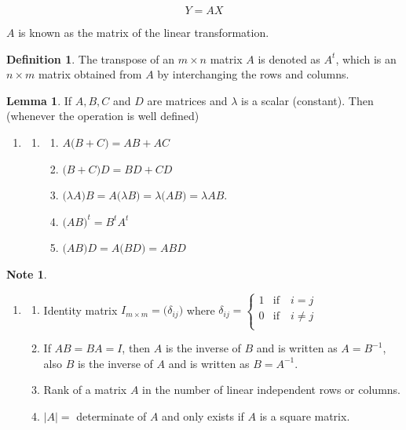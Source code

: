 \documentclass[11pt,a4paper]{article}
\theoremstyle{definition}
\newtheorem{defn}[thm]{Definition}
\newtheorem*{note}{Note}
\newtheorem{lem}[thm]{Lemma}
\begin{document}
$$\boxed{Y=AX}$$

$A$  is known as the matrix of the linear transformation.\\


\begin{defn}\label{res:defn:1.1.1}
The transpose of an $m\times n$ matrix $A$ is denoted as $A^t$, which is an $n\times m$ matrix obtained from $A$ by interchanging the rows and columns.
\end{defn}


\begin{lem}\label{res:lem:1.1.2}
If $A,B, C$ and $D$ are matrices and $\lambda$ is a scalar (constant). Then (whenever the operation is well defined)
\begin{enumerate}
\item[]
\begin{enumerate}
\item[]
\begin{enumerate}
       \item $A\big(B+C\big) = AB+AC$\\
       \item $\big(B+C\big)D = BD + CD$\\
       \item $\big(\lambda A\big)B = A\big(\lambda B\big)=\lambda\big(AB\big)= \lambda AB$.\\
       \item $\big(AB\big)^t=B^tA^t$\\
       \item $\big(AB\big)D=A\big(BD\big) = ABD$\\
\end{enumerate}
\end{enumerate}
\end{enumerate}

\end{lem}


\begin{note}
\begin{enumerate}
\item[]
\begin{enumerate}
    \item[i.] Identity matrix $I_{m\times m}=\big(\delta_{ij}\big)$ where 
$\delta_{ij}=
\begin{cases}
1 & \text{if}\quad  i=j\\
0 & \text{if}\quad  i\neq j\\
\end{cases}
$
      \item[ii.] If $AB=BA=I$, then $A$ is the inverse of $B$ and is written as $A=B^{-1}$,
      also $B$ is the inverse of $A$ and is written as $B=A^{-1}$.
      \item[iii.] Rank of a matrix $A$ in the number of   linear independent rows or columns.
      \item[iv.] $|A|=$ determinate of $A$ and only exists if $A$ is a square matrix.\\
\end{enumerate}
\end{enumerate}
\end{note}
\end{document}
